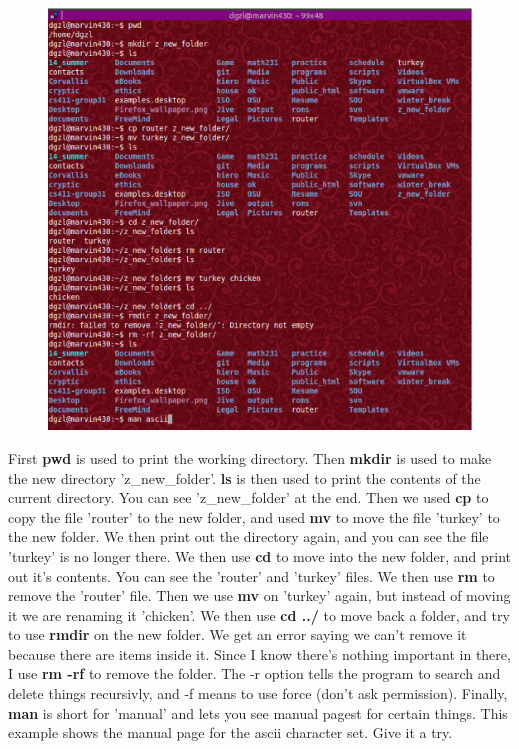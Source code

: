 \documentclass[letterpaper,10pt,titlepage,fleqn]{article}
\begin{document}
\begin{figure}[ht!]
  \includegraphics[scale=0.5]{images/shell_commands.eps}
\end{figure}

First \textbf{pwd} is used to print the working directory. Then \textbf{mkdir}
is used to make the new directory 'z\_new\_folder'. \textbf{ls} is then used to
print the contents of the current directory. You can see 'z\_new\_folder' at the
end. Then we used \textbf{cp} to copy the file 'router' to the new folder, and
used \textbf{mv} to move the file 'turkey' to the new folder. We then print out
the directory again, and you can see the file 'turkey' is no longer there. We
then use \textbf{cd} to move into the new folder, and print out it's contents.
You can see the 'router' and 'turkey' files. We then use \textbf{rm} to remove
the 'router' file. Then we use \textbf{mv} on 'turkey' again, but instead of 
moving it we are renaming it 'chicken'. We then use \textbf{cd ../} to move back
a folder, and try to use \textbf{rmdir} on the new folder. We get an error
saying we can't remove it because there are items inside it. Since I know
there's nothing important in there, I use \textbf{rm -rf} to remove the folder.
The -r option tells the program to search and delete things recursivly, and -f
means to use force (don't ask permission). Finally, \textbf{man} is short for
'manual' and lets you see manual pagest for certain things. This example shows
the manual page for the ascii character set. Give it a try.
\end{document}
